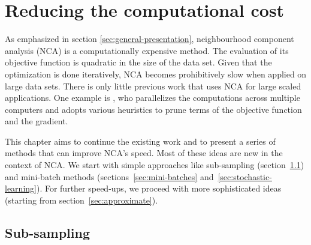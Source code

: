\chapter{Reducing the computational cost}
\label{ch:reducing}

As emphasized in section \ref{sec:general-presentation}, neighbourhood component analysis (NCA) is a computationally expensive method. The evaluation of its objective function is quadratic in the size of the data set. Given that the optimization is done iteratively, NCA becomes prohibitively slow when applied on large data sets. There is only little previous work that uses NCA for large scaled applications. One example is \citet{singh2010}, who parallelizes the computations across multiple computers and adopts various heuristics to prune terms of the objective function and the gradient.

This chapter aims to continue the existing work and to present a series of methods that can improve NCA's speed. Most of these ideas are new in the context of NCA. We start with simple approaches like sub-sampling (section~\ref{sec:sub-sampling}) and mini-batch methods (sections~\ref{sec:mini-batches} and~\ref{sec:stochastic-learning}). For further speed-ups, we proceed with more sophisticated ideas (starting from section~\ref{sec:approximate}). 


\section{Sub-sampling}
\label{sec:sub-sampling}

